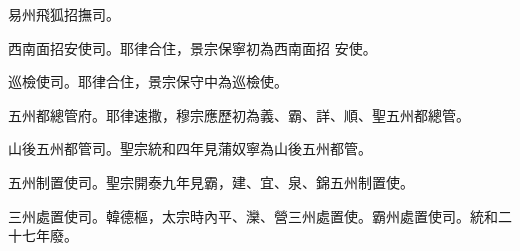 \begin{pinyinscope}
 易州飛狐招撫司。



 西南面招安使司。耶律合住，景宗保寧初為西南面招
 安使。



 巡檢使司。耶律合住，景宗保守中為巡檢使。



 五州都總管府。耶律速撒，穆宗應歷初為義、霸、詳、順、聖五州都總管。



 山後五州都管司。聖宗統和四年見蒲奴寧為山後五州都管。



 五州制置使司。聖宗開泰九年見霸，建、宜、泉、錦五州制置使。



 三州處置使司。韓德樞，太宗時內平、灤、營三州處置使。霸州處置使司。統和二十七年廢。



\end{pinyinscope}